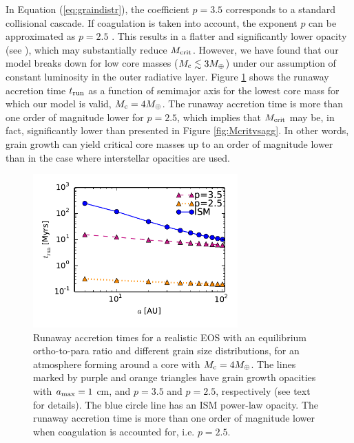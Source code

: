 In Equation (\ref{eq:graindistr}), the coefficient $p=3.5$ corresponds to a standard collisional cascade. If coagulation is taken into account, the exponent $p$ can be approximated as $p=2.5$ \citep{dalessio01}. This results in a flatter and significantly lower opacity (see ), which may substantially reduce $M_{\rm crit}$. However, we have found that our model breaks down for low core masses ($M_{\rm c} \lesssim 3 M_{\oplus}$) under our assumption of constant luminosity in the outer radiative layer. Figure \ref{fig:p25p35} shows the runaway accretion time $t_{\rm run}$ as a function of semimajor axis for the lowest core mass for which our model is valid, $M_{\rm c}=4 M_{\oplus}$. The runaway accretion time is more than one order of magnitude lower for $p=2.5$, which implies that $M_{\rm crit}$ may be, in fact, significantly lower than presented in Figure \ref{fig:Mcritvsagg}. In other words, grain growth can yield critical core masses up to an order of magnitude lower than in the case where interstellar opacities are used.

\begin{figure}[H]
\centering
\includegraphics[width=0.7\textwidth]{figures/tco_vs_a_Mc4_comp.pdf}
\caption{Runaway accretion times for a realistic EOS with an equilibrium ortho-to-para ratio and different grain size distributions, for an atmosphere forming around a core with $M_{\rm c}=4 M_{\oplus}$. The lines marked by purple and orange triangles have grain growth opacities with $a_{\rm max}=1$ cm, and $p=3.5$ and $p=2.5$, respectively (see text for details). The blue circle line has an ISM power-law opacity. The runaway accretion time is more than one order of magnitude lower when coagulation is accounted for, i.e. $p=2.5$.}
\label{fig:p25p35}
\end{figure}

